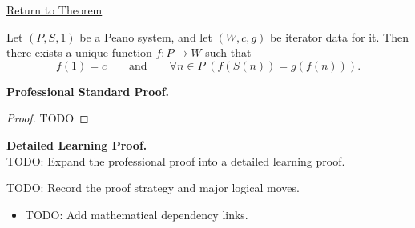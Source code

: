 \newpage
{}
\label{prf:peano-iterator-theorem}

\begin{remark*}[Return]
\hyperref[thm:peano-iterator-theorem]{Return to Theorem}
\end{remark*}

\begin{theorem*}
Let $(P,S,1)$ be a Peano system, and let $(W,c,g)$ be iterator data for it.
Then there exists a unique function $f:P\to W$ such that
\[
f(1)=c
\qquad\text{and}\qquad
\forall n\in P\;(f(S(n))=g(f(n))).
\]
\end{theorem*}

\textbf{Professional Standard Proof.}~\\
\begin{proof}
TODO
\end{proof}

\textbf{Detailed Learning Proof.}~\\
TODO: Expand the professional proof into a detailed learning proof.

\begin{remark*}
TODO: Record the proof strategy and major logical moves.
\end{remark*}

\begin{dependencies}
\begin{itemize}
  \item TODO: Add mathematical dependency links.
\end{itemize}
\end{dependencies}
